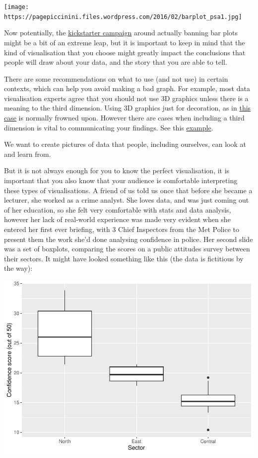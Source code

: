 \documentclass[
]{book}
\begin{document}
\texttt{[image: https://pagepiccinini.files.wordpress.com/2016/02/barplot\_psa1.jpg]}

Now potentially, the \href{https://www.kickstarter.com/projects/1474588473/barbarplots/description}{kickstarter campaign} around actually banning bar plots might be a bit of an extreme leap, but it is important to keep in mind that the kind of visualisation that you choose might greatly impact the conclusions that people will draw about your data, and the story that you are able to tell.

There are some recommendations on what to use (and not use) in certain contexts, which can help you avoid making a bad graph. For example, most data visualisation experts agree that you should not use 3D graphics unless there is a meaning to the third dimension. Using 3D graphics just for decoration, as in \href{https://mir-s3-cdn-cf.behance.net/project_modules/disp/2505dd10837923.56030acd2ef20.jpg}{this case} is normally frowned upon. However there are cases when including a third dimension is vital to communicating your findings. See this \href{http://www.visualisingdata.com/2015/03/when-3d-works/}{example}.

We want to create pictures of data that people, including ourselves, can look at and learn from.

But it is not always enough for you to know the perfect visualisation, it is important that you also know that your audience is comfortable interpreting these types of visualisations. A friend of us told us once that before she became a lecturer, she worked as a crime analyst. She loves data, and was just coming out of her education, so she felt very comfortable with stats and data analysis, however her lack of real-world experience was made very evident when she entered her first ever briefing, with 3 Chief Inspectors from the Met Police to present them the work she'd done analysing confidence in police. Her second slide was a set of boxplots, comparing the scores on a public attitudes survey between their sectors. It might have looked something like this (the data is fictitious by the way):

\includegraphics{bookdown-demo_files/figure-latex/unnamed-chunk-25-1.pdf}
\end{document}
